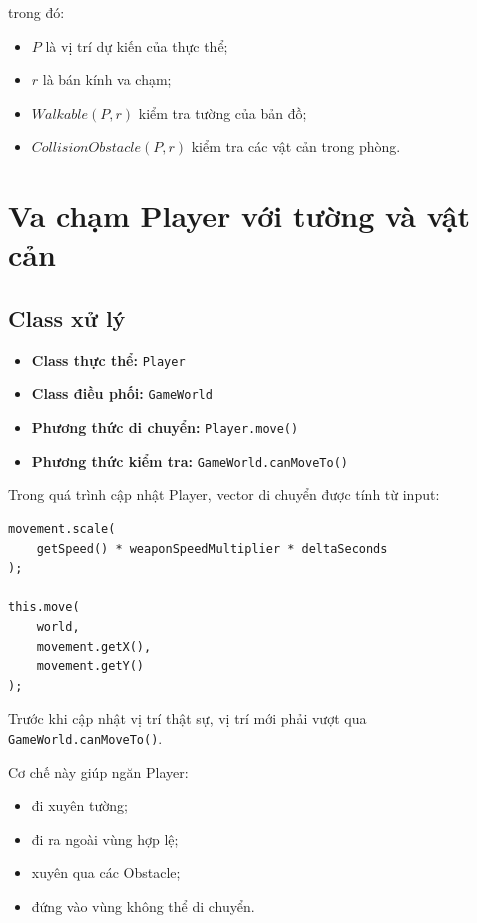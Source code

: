 \documentclass[12pt,a4paper]{report}
\begin{document}
    trong đó:

    \begin{itemize}
        \item $P$ là vị trí dự kiến của thực thể;
        \item $r$ là bán kính va chạm;
        \item $Walkable(P,r)$ kiểm tra tường của bản đồ;
        \item $CollisionObstacle(P,r)$ kiểm tra các vật cản trong phòng.
    \end{itemize}




    \section{Va chạm Player với tường và vật cản}

    \subsection{Class xử lý}

    \begin{itemize}
        \item \textbf{Class thực thể:} \texttt{Player}
        \item \textbf{Class điều phối:} \texttt{GameWorld}
        \item \textbf{Phương thức di chuyển:} \texttt{Player.move()}
        \item \textbf{Phương thức kiểm tra:} \texttt{GameWorld.canMoveTo()}
    \end{itemize}

    Trong quá trình cập nhật Player, vector di chuyển được tính từ input:

    \begin{verbatim}
movement.scale(
    getSpeed() * weaponSpeedMultiplier * deltaSeconds
);

this.move(
    world,
    movement.getX(),
    movement.getY()
);
    \end{verbatim}

    Trước khi cập nhật vị trí thật sự, vị trí mới phải vượt qua
    \texttt{GameWorld.canMoveTo()}.

    Cơ chế này giúp ngăn Player:

    \begin{itemize}
        \item đi xuyên tường;
        \item đi ra ngoài vùng hợp lệ;
        \item xuyên qua các Obstacle;
        \item đứng vào vùng không thể di chuyển.
    \end{itemize}
\end{document}
